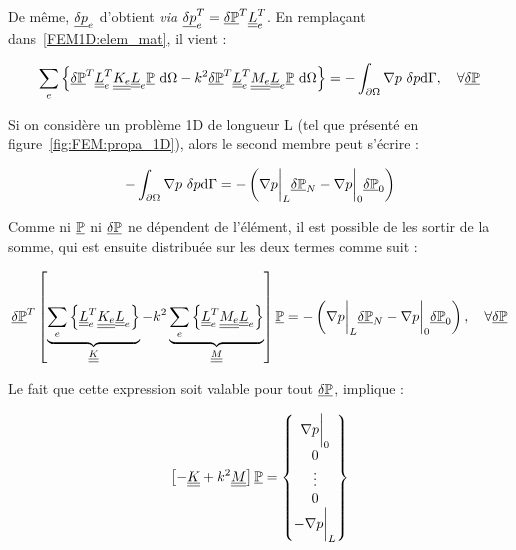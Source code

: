De même, $\ul{\DP}_e$ d'obtient \textit{via} $\ul{\DP}_e^T = \GDP^T\uul{L}_e^T$. En remplaçant dans~\eqref{FEM1D:elem_mat}, il
vient :

\begin{equation}
    \sum_e \left\{
	\GDP^T\uul{L}_e^T\uul{K_e}\uul{L}_e\GP~\dd\Omega - k^2 \GDP^T\uul{L}_e^T\uul{M_e}\uul{L}_e\GP~\dd\Omega \right\}
	= -\int_{\partial\Omega}\nabla p~\DP\dd\Gamma, \quad \forall\GDP\label{FEM1D:post_boolean}
\end{equation}


Si on considère un problème 1D de longueur L (tel que présenté en figure~\ref{fig:FEM:propa_1D}), alors le second membre
peut s'écrire :

$$-\int_{\partial\Omega}\nabla p~\DP\dd\Gamma = -\left(\nabla p\bigg|_L\GDP_N- \nabla p\bigg|_0\GDP_0\right)$$

Comme ni $\GP$ ni $\GDP$ ne dépendent de l'élément, il est possible de les sortir de la somme, qui est ensuite
distribuée sur les deux termes comme suit :

\begin{equation*}
	\GDP^T\left[\underbrace{\sum_e \left\{ \uul{L}_e^T\uul{K_e}\uul{L}_e\right\}}_{\uul{K}}
	- k^2 \underbrace{\sum_e\left\{\uul{L}_e^T\uul{M_e}\uul{L}_e\right\}}_{\uul{M}}\right]\GP
	= -\left(\nabla p\bigg|_L\GDP_N- \nabla p\bigg|_0\GDP_0\right), \quad \forall\GDP
\end{equation*}

Le fait que cette expression soit valable pour tout $\GDP$, implique :

\begin{equation}
\left[- \uul{K} + k^2\uul{M}\right]\GP = \begin{Bmatrix} \nabla p\bigg|_0\\0\\\vdots\\0\\-\nabla p\bigg|_L\end{Bmatrix} \label{FEM1D:final}
\end{equation}
